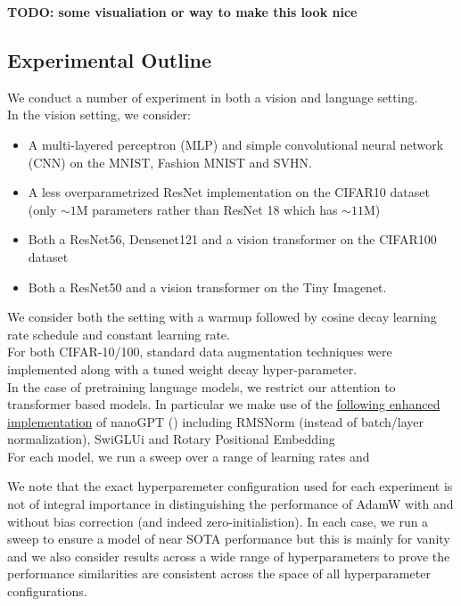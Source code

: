 \documentclass[12pt]{book}
\newcommand{\todo}[1]{{\color{red}\bf{TODO: #1}}}
\begin{document}
\todo{some visualiation or way to make this look nice}
\subsection{Experimental Outline}
We conduct a number of experiment in both a vision and language setting. \\
In the vision setting, we consider:
\begin{itemize}
\item A multi-layered perceptron (MLP) and simple convolutional neural network (CNN) on the MNIST, Fashion MNIST and SVHN.
\item A less overparametrized ResNet implementation on the CIFAR10 dataset (only $\sim 1$M parameters rather than ResNet 18 which has $\sim 11$M)
\item Both a ResNet56\footnotemark{}, Densenet121 \cite{huang2018denselyconnectedconvolutionalnetworks} and a vision transformer on the CIFAR100 dataset
\item Both a ResNet50 and a vision transformer on the Tiny Imagenet. 
\end{itemize}
We consider both the setting with a warmup followed by cosine decay learning rate schedule and constant learning rate. 
\\
For both CIFAR-10/100, standard data augmentation techniques were implemented along with a tuned weight decay hyper-parameter. 
\\
In the case of pretraining language models, we restrict our attention to transformer based models. In particular we make use of the \href{https://github.com/Niccolo-Ajroldi/plainLM/tree/main}{following enhanced implementation} of nanoGPT (\cite{Karpathy2022}) including RMSNorm (instead of batch/layer normalization), SwiGLUi\cite{swiGLU} and Rotary Positional Embedding
\\
For each model, we run a sweep over a range of learning rates and 

We note that the exact hyperparemeter configuration used for each experiment is not of integral importance in distinguishing the performance of AdamW with and without bias correction (and indeed zero-initialistion). In each case, we run a sweep to ensure a model of near SOTA performance but this is mainly for vanity and we also consider results across a wide range of hyperparameters to prove the performance similarities are consistent across the space of all hyperparameter configurations. 
\\
\end{document}

